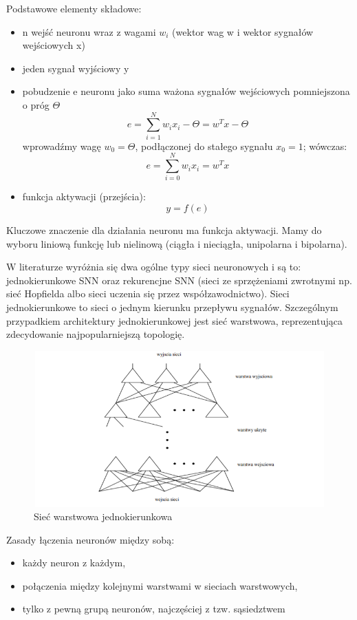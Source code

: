 Podstawowe elementy składowe: 
\begin{itemize}
    \item n wejść neuronu wraz z wagami $w_{i}$ (wektor wag w i wektor sygnałów wejściowych x)
    \item jeden sygnał wyjściowy y
    \item pobudzenie e neuronu jako suma ważona sygnałów wejściowych
pomniejszona o próg $\Theta$
\[
e = \sum_{i=1}^{N} w_{i} x_{i} - \Theta = w^{T} x - \Theta
\]
wprowadźmy wagę $w_{0}= \Theta$, podłączonej do stałego sygnału $x_{0} = 1$;
wówczas: 
\[
e = \sum_{i=0}^{N} w_{i} x_{i}  = w^{T} x
\]
\item funkcja aktywacji (przejścia):
\[
y = f(e)
\]
\end{itemize}
Kluczowe znaczenie dla działania neuronu ma funkcja aktywacji. Mamy do wyboru liniową funkcję lub nielinową (ciągła i nieciągła, unipolarna i bipolarna).

W literaturze wyróżnia się dwa ogólne typy sieci neuronowych i są to: jednokierunkowe SNN oraz rekurencjne SNN (sieci ze sprzężeniami zwrotnymi np. sieć Hopfielda albo sieci uczenia się przez współzawodnictwo).
Sieci jednokierunkowe to sieci o jednym kierunku przepływu sygnałów. Szczególnym przypadkiem architektury jednokierunkowej jest sieć warstwowa, reprezentująca zdecydowanie najpopularniejszą topologię.
\begin{figure}[h] 
        \centering\includegraphics[width=12cm,height=6cm]{figures/ArchitekturaSNN.png}
        \caption{Sieć warstwowa jednokierunkowa}\label{SVM-neuron}
\end{figure}

Zasady łączenia neuronów między sobą:
\begin{itemize}
    \item każdy neuron z każdym,
    \item połączenia między kolejnymi warstwami w sieciach warstwowych,
    \item tylko z pewną grupą neuronów, najczęściej z tzw. sąsiedztwem
\end{itemize}

